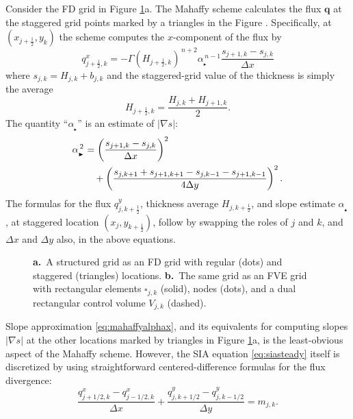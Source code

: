 \documentclass[twocolumn]{igs}
\newcommand\bq{\mathbf{q}}
\newcommand{\grad}{\nabla}
\newcommand\alpharight{\alpha_{{}_{\blacktriangleright}}}
\newcommand\alphaup{\alpha_{{\!}_{\blacktriangle}}}
\newcommand{\half}{\tfrac{1}{2}}
\begin{document}
Consider the FD grid in Figure \ref{fig:fdfemgrids}a.  The Mahaffy scheme calculates the flux $\bq$ at the staggered grid points marked by a triangles in the Figure \cite[equations (19), (20)]{Mahaffy1976}.  Specifically, at $(x_{j+\half},y_k)$ the scheme computes the $x$-component of the flux by
\begin{equation}
q^x_{j+\half,k} = - \Gamma (H_{j+\half,k})^{\,n+2} \alpharight^{\,n-1} \frac{s_{j+1,k} - s_{j,k}}{\Delta x}  \label{eq:mahaffyqx}
\end{equation}
where $s_{j,k} = H_{j,k} + b_{j,k}$ and the staggered-grid value of the thickness is simply the average
\begin{equation}
  H_{j+\half,k} = \frac{H_{j,k} + H_{j+1,k}}{2}.  \label{eq:mahaffyHav}
\end{equation}
The quantity ``$\alpharight$\!'' is an estimate of $|\grad s|$:
\begin{align}
\alpharight^{\,2} &= \left(\frac{s_{j+1,k} - s_{j,k}}{\Delta x}\right)^2  \label{eq:mahaffyalphax} \\
  &\quad + \left(\frac{s_{j,k+1} + s_{j+1,k+1} - s_{j,k-1} - s_{j+1,k-1}}{4 \Delta y}\right)^2. \notag
\end{align}
The formulas for the flux $q^y_{j,k+\half}$, thickness average $H_{j,k+\half}$, and slope estimate $\alphaup$\!, at staggered location $(x_j,y_{k+\half})$, follow by swapping the roles of $j$ and $k$, and $\Delta x$ and $\Delta y$ also, in the above equations.

\begin{figure}[ht]
\begin{center}
 \quad 
\end{center}
\caption{\textbf{a.}~A structured grid as an FD grid with regular (dots) and staggered (triangles) locations.  \textbf{b.}~The same grid as an FVE grid with rectangular elements $\square_{j,k}$ (solid), nodes (dots), and a dual rectangular control volume $V_{j,k}$ (dashed).}
\label{fig:fdfemgrids}
\end{figure}

Slope approximation \eqref{eq:mahaffyalphax}, and its equivalents for computing slopes $|\grad s|$ at the other locations marked by triangles in Figure \ref{fig:fdfemgrids}a, is the least-obvious aspect of the Mahaffy scheme.  However, the SIA equation \eqref{eq:siasteady} itself is discretized by \cite{Mahaffy1976} using straightforward centered-difference formulas \citep{MortonMayers2005} for the flux divergence:
\begin{equation}
\frac{q^x_{j+1/2,k} - q^x_{j-1/2,k}}{\Delta x} + \frac{q^y_{j,k+1/2}- q^y_{j,k-1/2}}{\Delta y} = m_{j,k}.  \label{eq:siasteadyfd}
\end{equation}
\end{document}
